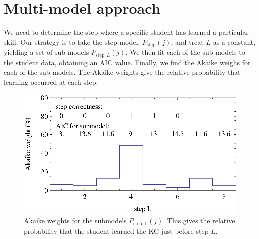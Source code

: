 \documentclass{acmlarge-edm}
\begin{document}
\section{Multi-model approach}
\label{multi-model}

We need to determine the step where a specific student has learned a
particular skill.  Our strategy is to take the step model, 
$P_\mathrm{step}(j)$, and treat $L$ as a constant, yielding a set of 
sub-models $P_{\mathrm{step},L}(j)$.
We then fit each of the sub-models to the student data, obtaining an
AIC value.  Finally, we find the Akaike weighs for each of the
sub-models.  The Akaike weights give the relative probability that learning
occurred at each step.

\begin{figure}
  \centering \includegraphics{step-weights.eps}
   \caption{Akaike weights for the submodels $P_\mathrm{step,L}(j)$.  
     This gives the relative probability that
      the student learned the KC just before step $L$.}
    \label{step-weights}
\end{figure}
\end{document}
